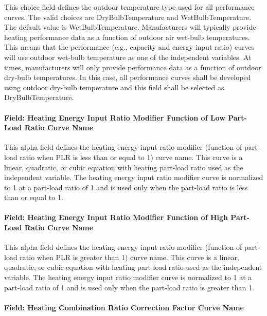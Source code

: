 This choice field defines the outdoor temperature type used for all performance curves. The valid choices are DryBulbTemperature and WetBulbTemperature. The default value is WetBulbTemperature. Manufacturers will typically provide heating performance data as a function of outdoor air wet-bulb temperatures. This means that the performance (e.g., capacity and energy input ratio) curves will use outdoor wet-bulb temperature as one of the independent variables. At times, manufacturers will only provide performance data as a function of outdoor dry-bulb temperatures. In this case, all performance curves shall be developed using outdoor dry-bulb temperature and this field shall be selected as DryBulbTemperature.

\paragraph{Field: Heating Energy Input Ratio Modifier Function of Low Part-Load Ratio Curve Name}\label{field-heating-energy-input-ratio-modifier-function-of-low-part-load-ratio-curve-name}

This alpha field defines the heating energy input ratio modifier (function of part-load ratio when PLR is less than or equal to 1) curve name. This curve is a linear, quadratic, or cubic equation with heating part-load ratio used as the independent variable. The heating energy input ratio modifier curve is normalized to 1 at a part-load ratio of 1 and is used only when the part-load ratio is less than or equal to 1.

\paragraph{Field: Heating Energy Input Ratio Modifier Function of High Part-Load Ratio Curve Name}\label{field-heating-energy-input-ratio-modifier-function-of-high-part-load-ratio-curve-name}

This alpha field defines the heating energy input ratio modifier (function of part-load ratio when PLR is greater than 1) curve name. This curve is a linear, quadratic, or cubic equation with heating part-load ratio used as the independent variable. The heating energy input ratio modifier curve is normalized to 1 at a part-load ratio of 1 and is used only when the part-load ratio is greater than 1.

\paragraph{Field: Heating Combination Ratio Correction Factor Curve Name}\label{field-heating-combination-ratio-correction-factor-curve-name}

